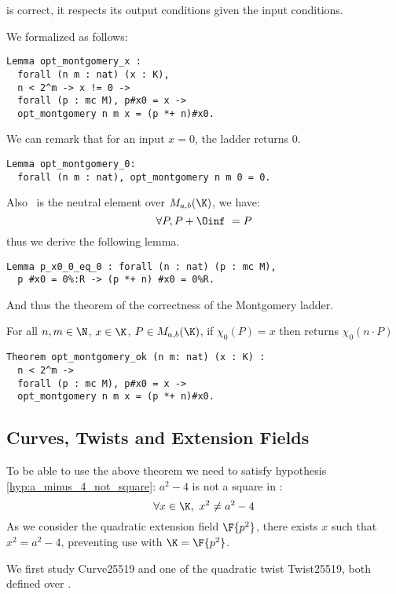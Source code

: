 \begin{lemma}
\label{lemma:montgomery-double-add}
 is correct, \ie it respects its output
conditions given the input conditions.
\end{lemma}
We formalized  as follows:
\begin{lstlisting}[language=Coq]
Lemma opt_montgomery_x :
  forall (n m : nat) (x : K),
  n < 2^m -> x != 0 ->
  forall (p : mc M), p#x0 = x ->
  opt_montgomery n m x = (p *+ n)#x0.
\end{lstlisting}
We can remark that for an input $x = 0$, the ladder returns $0$.
\begin{lstlisting}[language=Coq]
Lemma opt_montgomery_0:
  forall (n m : nat), opt_montgomery n m 0 = 0.
\end{lstlisting}
Also \Oinf\ is the neutral element over $M_{a,b}(\K)$, we have:
$$\forall P, P + \Oinf\ = P$$
thus we derive the following lemma.
\begin{lstlisting}[language=Coq]
Lemma p_x0_0_eq_0 : forall (n : nat) (p : mc M),
  p #x0 = 0%:R -> (p *+ n) #x0 = 0%R.
\end{lstlisting}
And thus the theorem of the correctness of the Montgomery ladder.
\begin{theorem}
\label{thm:montgomery-ladder-correct}
For all $n, m \in \N$, $x \in \K$, $P \in M_{a,b}(\K)$,
if $\chi_0(P) = x$ then  returns $\chi_0(n \cdot P)$
\end{theorem}
\begin{lstlisting}[language=Coq]
Theorem opt_montgomery_ok (n m: nat) (x : K) :
  n < 2^m ->
  forall (p : mc M), p#x0 = x ->
  opt_montgomery n m x = (p *+ n)#x0.
\end{lstlisting}

\subsection{Curves, Twists and Extension Fields}

To be able to use the above theorem we need to satisfy hypothesis
\ref{hyp:a_minus_4_not_square}: $a^2-4$ is not a square in \K:
$$\forall x \in \K,\ x^2 \neq a^2-4$$
As we consider the quadratic extension field $\F{p^2}$,
there exists $x$ such that $x^2 = a^2-4$, preventing use 
with $\K = \F{p^2}$.

We first study Curve25519 and one of the quadratic twist Twist25519, both defined
over .

